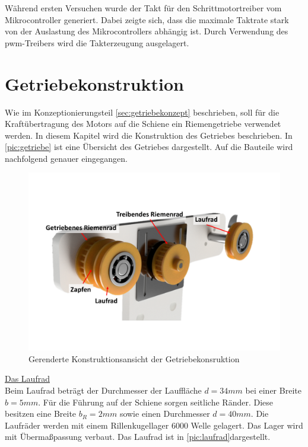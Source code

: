 Während ersten Versuchen wurde der Takt für den Schrittmotortreiber vom Mikrocontroller generiert. Dabei zeigte sich, dass die maximale Taktrate stark von der Auslastung des Mikrocontrollers abhängig ist. Durch Verwendung des \acrshort{pwm}-Treibers wird die Takterzeugung ausgelagert. 
 

\section{Getriebekonstruktion}
Wie im Konzeptionierungsteil \ref{sec:getriebekonzept} beschrieben, soll für die Kraftübertragung des Motors auf die Schiene ein Riemengetriebe verwendet werden. In diesem Kapitel wird die Konstruktion des Getriebes beschrieben. In \autoref{pic:getriebe} ist eine Übersicht des Getriebes dargestellt. Auf die Bauteile wird nachfolgend genauer eingegangen. 

\begin{figure}[h]
	\begin{center}
		\includegraphics[width=12cm]{getriebe.pdf}
		\caption{Gerenderte Konstruktionsansicht der Getriebekonsruktion}
		\label{pic:getriebe}
	\end{center}
\end{figure} 
\newpage


\underline{Das Laufrad}\\
Beim Laufrad beträgt der Durchmesser der Lauffläche $d=34mm$ bei einer Breite $b=5mm$. Für die Führung auf der Schiene sorgen seitliche Ränder. Diese besitzen eine Breite $b_R=2mm$ sowie einen Durchmesser $d=40mm$. Die Laufräder werden mit einem Rillenkugellager 6000 Welle gelagert. Das Lager wird mit Übermaßpassung verbaut. Das Laufrad ist in \autoref{pic:laufrad}dargestellt. \\

